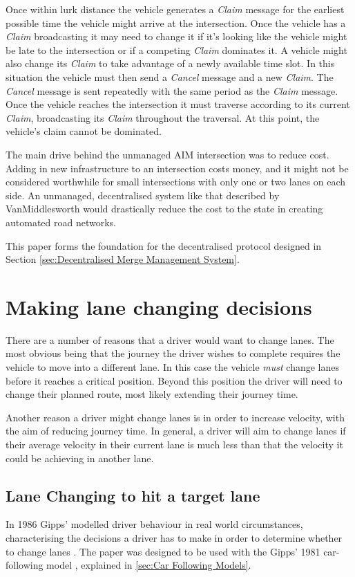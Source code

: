 Once within lurk distance the vehicle generates a \emph{Claim} message for the earliest possible time the vehicle might arrive at the intersection. Once the vehicle has a \emph{Claim} broadcasting it may need to change it if it's looking like the vehicle might be late to the intersection or if a competing \emph{Claim} dominates it. A vehicle might also change its \emph{Claim} to take advantage of a newly available time slot. In this situation the vehicle must then send a \emph{Cancel} message and a new \emph{Claim}. The \emph{Cancel} message is sent repeatedly with the same period as the \emph{Claim} message. Once the vehicle reaches the intersection it must traverse according to its current \emph{Claim}, broadcasting its \emph{Claim} throughout the traversal. At this point, the vehicle's claim cannot be dominated.

The main drive behind the unmanaged AIM intersection was to reduce cost. Adding in new infrastructure to an intersection costs money, and it might not be considered worthwhile for small intersections with only one or two lanes on each side. An unmanaged, decentralised system like that described by VanMiddlesworth would drastically reduce the cost to the state in creating automated road networks.

This paper forms the foundation for the decentralised protocol designed in Section \ref{sec:Decentralised Merge Management System}.

\section{Making lane changing decisions}
\label{sec:Making lane changing decisions}
There are a number of reasons that a driver would want to change lanes. The most obvious being that the journey the driver wishes to complete requires the vehicle to move into a different lane. In this case the vehicle \emph{must} change lanes before it reaches a critical position. Beyond this position the driver will need to change their planned route, most likely extending their journey time. 

Another reason a driver might change lanes is in order to increase velocity, with the aim of reducing journey time. In general, a driver will aim to change lanes if their average velocity in their current lane is much less than that the velocity it could be achieving in another lane.

\subsection{Lane Changing to hit a target lane}
\label{subsec:Lane Changing to hit a target lane}
In 1986 Gipps' modelled driver behaviour in real world circumstances, characterising the decisions a driver has to make in order to determine whether to change lanes \citep{Gipps1986}. The paper was designed to be used with the Gipps' 1981 car-following model \citep{Gipps1981}, explained in \ref{sec:Car Following Models}.

